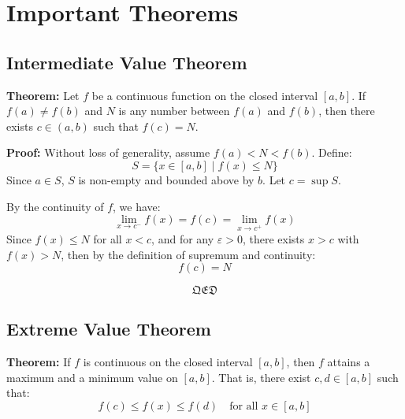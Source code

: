 \section{Important Theorems}

\subsection{Intermediate Value Theorem}

\textbf{Theorem:}  
Let \( f \) be a continuous function on the closed interval \([a, b]\). If \( f(a) \ne f(b) \) and \( N \) is any number between \( f(a) \) and \( f(b) \), then there exists \( c \in (a, b) \) such that \( f(c) = N \).

\textbf{Proof:}  
Without loss of generality, assume \( f(a) < N < f(b) \).  
Define:
\[
S = \{ x \in [a, b] \mid f(x) \le N \}
\]
Since \( a \in S \), \( S \) is non-empty and bounded above by \( b \). Let \( c = \sup S \).

By the continuity of \( f \), we have:
\[
\lim_{x \to c^-} f(x) = f(c) = \lim_{x \to c^+} f(x)
\]
Since \( f(x) \le N \) for all \( x < c \), and for any \( \varepsilon > 0 \), there exists \( x > c \) with \( f(x) > N \), then by the definition of supremum and continuity:
\[
f(c) = N
\]

\[\mathfrak{QED}\]

\begin{center}
\end{center}



\subsection{Extreme Value Theorem}

\textbf{Theorem:}  
If \( f \) is continuous on the closed interval \([a, b] \), then \( f \) attains a maximum and a minimum value on \([a, b]\).  
That is, there exist \( c, d \in [a, b] \) such that:
\[
f(c) \le f(x) \le f(d) \quad \text{for all } x \in [a, b]
\]

